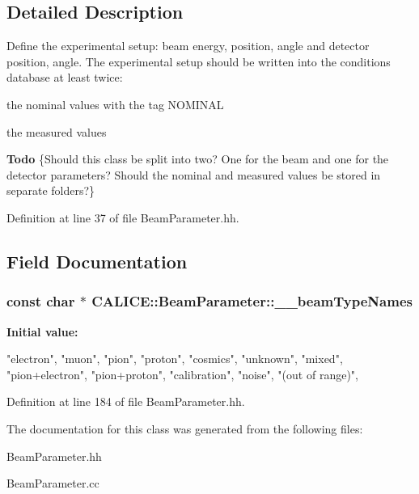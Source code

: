 \subsection{Detailed Description}
Define the experimental setup: beam energy, position, angle and detector position, angle. The experimental setup should be written into the conditions database at least twice: 
\begin{DoxyItemize}
\item the nominal values with the tag NOMINAL 
\item the measured values 
\end{DoxyItemize}\begin{Desc}
\item[{\bf Todo}]\{Should this class be split into two? One for the beam and one for the detector parameters? Should the nominal and measured values be stored in separate folders?\} \end{Desc}


Definition at line 37 of file BeamParameter.hh.

\subsection{Field Documentation}
\subsubsection[{\_\-\_\-beamTypeNames}]{\setlength{\rightskip}{0pt plus 5cm}const char $\ast$ CALICE::BeamParameter::\_\-\_\-beamTypeNames\hspace{0.3cm}{\ttfamily  [static]}}\label{classCALICE_1_1BeamParameter_a5bab90e1ec133f8427213561be2fc669}
{\bfseries Initial value:}
\begin{DoxyCode}
{
    "electron",
    "muon",
    "pion",
    "proton",
    "cosmics",
    "unknown",
    "mixed", 
    "pion+electron",
    "pion+proton",
    "calibration",
    "noise",
    "(out of range)",
  }
\end{DoxyCode}


Definition at line 184 of file BeamParameter.hh.

The documentation for this class was generated from the following files:\begin{DoxyCompactItemize}
\item 
BeamParameter.hh\item 
BeamParameter.cc\end{DoxyCompactItemize}
